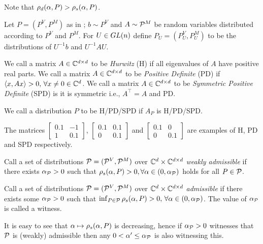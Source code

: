 Note that $\rhod{P}>\rhos{P}$.
\begin{definition}\label{def:simdist}
Let $P=(P^V,P^M)$ as in ; $b\sim P^V$ and $A\sim \P^M$ be random variables distributed according to $P^V$ and $P^M$. For $U\in \gln$ define $P_U=(P_U^V,P_U^M)$ to be the distributions of $U^{-1}b$ and $U^{-1}AU$.
\end{definition}
\begin{definition}
We call a matrix $A\in \C^{\dcd}$ to be \emph{Hurwitz} (H) if all eigenvalues of $A$ have positive real parts. We call a matrix $A\in \C^{\dcd}$ to be \emph{Positive Definite} (PD) if $\ip{x,Ax} >0,\,\forall x\neq 0 \in \C^{d}$.  We call a matrix $A\in \C^{\dcd}$ to be \emph{Symmetric Positive Definite} (SPD) is it is symmetric i.e., $A^\top=A$ and PD.
\end{definition}
\begin{definition}\label{distpd}
We call a distribution $P$ to be H/PD/SPD if $A_P$ is H/PD/SPD.
\end{definition}
\begin{example}
The matrices $\begin{bmatrix}0.1 &-1\\ 1 & 0.1\end{bmatrix}$, $\begin{bmatrix} 0.1 & 0.1 \\ 0 & 0.1\end{bmatrix}$ and $\begin{bmatrix}0.1 &0 \\ 0 & 0.1\end{bmatrix}$ are examples of H, PD and SPD respectively.
\end{example}

\begin{definition}
Call a set of distributions $\P=(\P^V,\P^M)$ over $\C^{d}\times \C^{\dcd}$
\emph{weakly admissible} if there exists $\alpha_{\P}>0$ such that
$\rhos{P}>0,\forall \alpha\in(0,\alpha_{\P})$ holds for all $P\in \P$.
\end{definition}
\begin{definition}
Call a set of distributions $\P=(\P^V,\P^M)$ over $\C^{d}\times \C^{\dcd}$ \emph{admissible}
if there exists some $\alpha_{\P}>0$ such that $\inf_{P\in \P} \rhos{P}>0,\,\forall \alpha\in(0,\alpha_{\P})$.
The value of $\alpha_{\P}$ is called a witness.
\end{definition}

It is easy to see that $\alpha \mapsto \rhos{P}$ is decreasing,
hence if $\alpha_{\P}>0$ witnesses that $\P$ is (weakly) admissible
then any $0<\alpha'\le \alpha_{\P}$ is also witnessing this.
